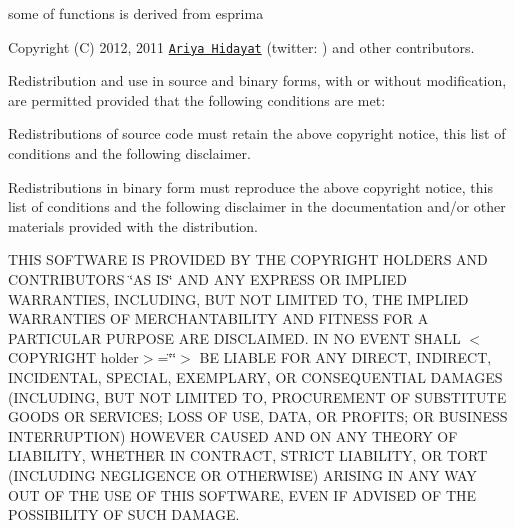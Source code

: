 some of functions is derived from esprima

Copyright (C) 2012, 2011 \href{http://ariya.ofilabs.com/about}{\tt Ariya Hidayat} (twitter\+: \href{http://twitter.com/ariyahidayat}{\tt }) and other contributors.

Redistribution and use in source and binary forms, with or without modification, are permitted provided that the following conditions are met\+:


\begin{DoxyItemize}
\item Redistributions of source code must retain the above copyright notice, this list of conditions and the following disclaimer.
\item Redistributions in binary form must reproduce the above copyright notice, this list of conditions and the following disclaimer in the documentation and/or other materials provided with the distribution.
\end{DoxyItemize}

T\+H\+IS S\+O\+F\+T\+W\+A\+RE IS P\+R\+O\+V\+I\+D\+ED BY T\+HE C\+O\+P\+Y\+R\+I\+G\+HT H\+O\+L\+D\+E\+RS A\+ND C\+O\+N\+T\+R\+I\+B\+U\+T\+O\+RS \char`\"{}\+A\+S I\+S\char`\"{} A\+ND A\+NY E\+X\+P\+R\+E\+SS OR I\+M\+P\+L\+I\+ED W\+A\+R\+R\+A\+N\+T\+I\+ES, I\+N\+C\+L\+U\+D\+I\+NG, B\+UT N\+OT L\+I\+M\+I\+T\+ED TO, T\+HE I\+M\+P\+L\+I\+ED W\+A\+R\+R\+A\+N\+T\+I\+ES OF M\+E\+R\+C\+H\+A\+N\+T\+A\+B\+I\+L\+I\+TY A\+ND F\+I\+T\+N\+E\+SS F\+OR A P\+A\+R\+T\+I\+C\+U\+L\+AR P\+U\+R\+P\+O\+SE A\+RE D\+I\+S\+C\+L\+A\+I\+M\+ED. IN NO E\+V\+E\+NT S\+H\+A\+LL $<$\+C\+O\+P\+Y\+R\+I\+G\+H\+T holder$>$=\char`\"{}\char`\"{}$>$ BE L\+I\+A\+B\+LE F\+OR A\+NY D\+I\+R\+E\+CT, I\+N\+D\+I\+R\+E\+CT, I\+N\+C\+I\+D\+E\+N\+T\+AL, S\+P\+E\+C\+I\+AL, E\+X\+E\+M\+P\+L\+A\+RY, OR C\+O\+N\+S\+E\+Q\+U\+E\+N\+T\+I\+AL D\+A\+M\+A\+G\+ES (I\+N\+C\+L\+U\+D\+I\+NG, B\+UT N\+OT L\+I\+M\+I\+T\+ED TO, P\+R\+O\+C\+U\+R\+E\+M\+E\+NT OF S\+U\+B\+S\+T\+I\+T\+U\+TE G\+O\+O\+DS OR S\+E\+R\+V\+I\+C\+ES; L\+O\+SS OF U\+SE, D\+A\+TA, OR P\+R\+O\+F\+I\+TS; OR B\+U\+S\+I\+N\+E\+SS I\+N\+T\+E\+R\+R\+U\+P\+T\+I\+ON) H\+O\+W\+E\+V\+ER C\+A\+U\+S\+ED A\+ND ON A\+NY T\+H\+E\+O\+RY OF L\+I\+A\+B\+I\+L\+I\+TY, W\+H\+E\+T\+H\+ER IN C\+O\+N\+T\+R\+A\+CT, S\+T\+R\+I\+CT L\+I\+A\+B\+I\+L\+I\+TY, OR T\+O\+RT (I\+N\+C\+L\+U\+D\+I\+NG N\+E\+G\+L\+I\+G\+E\+N\+CE OR O\+T\+H\+E\+R\+W\+I\+SE) A\+R\+I\+S\+I\+NG IN A\+NY W\+AY O\+UT OF T\+HE U\+SE OF T\+H\+IS S\+O\+F\+T\+W\+A\+RE, E\+V\+EN IF A\+D\+V\+I\+S\+ED OF T\+HE P\+O\+S\+S\+I\+B\+I\+L\+I\+TY OF S\+U\+CH D\+A\+M\+A\+GE.

